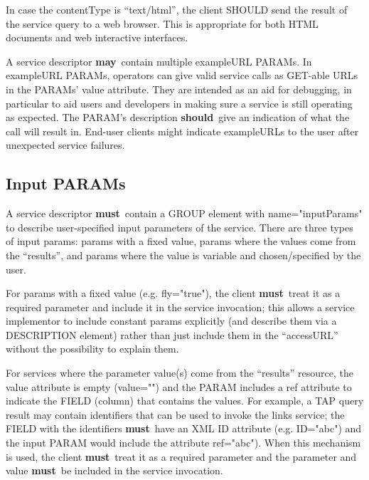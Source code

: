 \documentclass[11pt,a4paper]{ivoa}
\newcommand{\attval}[2]{#1={\allowbreak}{"}#2{"}}
\newcommand{\rfcmust}{\textbf{must}}
\newcommand{\rfcshould}{\textbf{should}}
\newcommand{\rfcmay}{\textbf{may}}
\begin{document}
In case the contentType is ``text/html'', the client SHOULD send the result
of the service query to a web browser.  This is appropriate for both HTML
documents and web interactive interfaces.

A service descriptor \rfcmay\ contain multiple exampleURL PARAMs.
In exampleURL PARAMs, operators can give valid service calls as GET-able
URLs in the PARAMs' value attribute. They are intended as an aid for
debugging, in particular to aid users and developers in making sure a
service is still operating as expected. The PARAM's description \rfcshould\
give an indication of what the call will result in. End-user clients
might indicate exampleURLs to the user after unexpected service failures.

\subsection{Input PARAMs}

A service descriptor \rfcmust\ contain a GROUP element with \attval{name}{inputParams}
to describe user-specified input parameters of the service. There are three types of
input params: params with a fixed value, params where the values come from the
``results'', and params where the value is variable and chosen/specified by the user.

For params with a fixed value (e.g. \attval{fly}{true}), the client \rfcmust\
treat it as a required parameter and include it in the service invocation; this allows
a service implementor to include constant params explicitly (and describe them via a
DESCRIPTION element) rather than just include them in the ``accessURL'' without the
possibility to explain them.

For services where the parameter value(s) come from the ``results'' resource, the value
attribute is empty (\attval{value}{}) and the PARAM includes a ref attribute to indicate
the FIELD (column) that contains the values. For example, a TAP query result may contain
identifiers that can be used to invoke the {links} service; the FIELD with the identifiers
\rfcmust\ have an XML ID attribute (e.g. \attval{ID}{abc}) and the input PARAM would include
the attribute \attval{ref}{abc}). When this mechanism is used, the client \rfcmust\
treat it as a required parameter and the parameter and value \rfcmust\ be included in
the service invocation.
\end{document}
